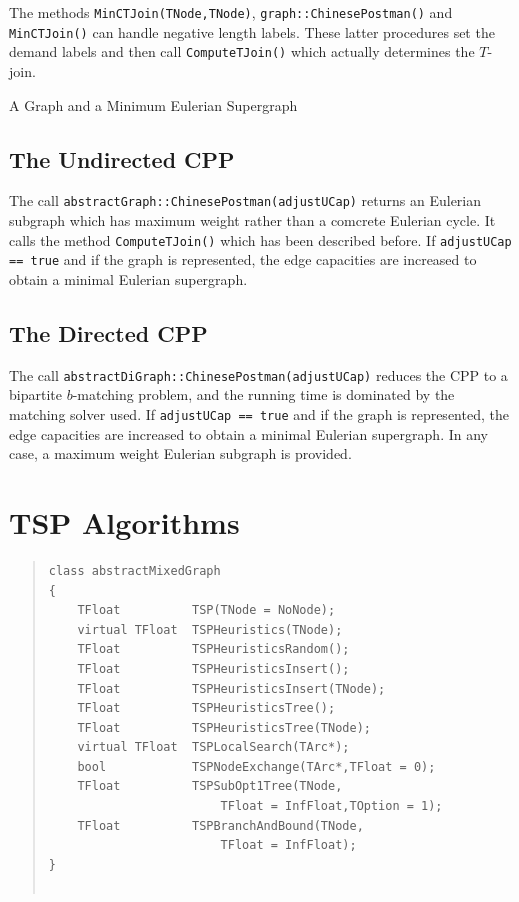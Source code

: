 \documentclass[a4paper,11pt,twoside]{book}
\begin{document}
\begin{multicols}{2}
The methods \verb/MinCTJoin(TNode,TNode)/, \verb/graph::ChinesePostman()/ and
\verb/MinCTJoin()/ can handle negative length labels. These
latter procedures set the demand labels and then call \verb/ComputeTJoin()/
which actually determines the $T$-join.

\bigskip
\begin{figurehere}
\begin{center}
\epsfxsize=4cm
\epsfxsize=4cm
\hspace*{1.5cm}
\vspace{0.5cm}
\caption{\label{flb_postman}A Graph and a Minimum Eulerian Supergraph}
\end{center}
\end{figurehere}


\subsection{The Undirected CPP}
The call \verb/abstractGraph::ChinesePostman(adjustUCap)/ returns an Eulerian
subgraph which has maximum weight rather than a comcrete Eulerian cycle. It calls
the method \verb/ComputeTJoin()/ which has been described before. If
\verb/adjustUCap == true/ and if the graph is represented, the edge capacities
are increased to obtain a minimal Eulerian supergraph.


\subsection{The Directed CPP}
The call \verb/abstractDiGraph::ChinesePostman(adjustUCap)/ reduces the CPP to a
bipartite $b$-matching problem, and the running time is dominated by the matching
solver used. If \verb/adjustUCap == true/ and if the graph is represented, the
edge capacities are increased to obtain a minimal Eulerian supergraph. In any case,
a maximum weight Eulerian subgraph is provided.



\section{TSP Algorithms}
\label{slb_solve_tsp}
\methods
\begin{quote}
\begin{verbatim}
class abstractMixedGraph
{
    TFloat          TSP(TNode = NoNode);
    virtual TFloat  TSPHeuristics(TNode);
    TFloat          TSPHeuristicsRandom();
    TFloat          TSPHeuristicsInsert();
    TFloat          TSPHeuristicsInsert(TNode);
    TFloat          TSPHeuristicsTree();
    TFloat          TSPHeuristicsTree(TNode);
    virtual TFloat  TSPLocalSearch(TArc*);
    bool            TSPNodeExchange(TArc*,TFloat = 0);
    TFloat          TSPSubOpt1Tree(TNode,
                        TFloat = InfFloat,TOption = 1);
    TFloat          TSPBranchAndBound(TNode,
                        TFloat = InfFloat);
}


\end{verbatim}
\end{quote}
\end{multicols}
\end{document}
